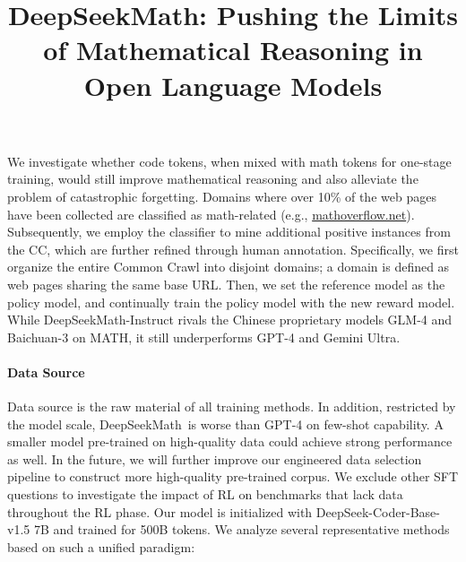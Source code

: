 \title{DeepSeekMath: Pushing the Limits of Mathematical Reasoning in Open Language Models}
We investigate whether code tokens, when mixed with math tokens for one-stage training, would still improve mathematical reasoning and also alleviate the problem of catastrophic forgetting. Domains where over 10\% of the web pages have been collected are classified as math-related (e.g., \url{mathoverflow.net}). Subsequently, we employ the classifier to mine additional positive instances from the CC, which are further refined through human annotation. Specifically, we first organize the entire Common Crawl into disjoint domains; a domain is defined as web pages sharing the same base URL. Then, we set the reference model as the policy model, and continually train the policy model with the new reward model. While DeepSeekMath-Instruct rivals the Chinese proprietary models GLM-4 and Baichuan-3 on MATH, it still underperforms GPT-4 and Gemini Ultra. \paragraph{Data Source} Data source is the raw material of all training methods. In addition, restricted by the model scale, DeepSeekMath~is worse than GPT-4 on few-shot capability. A smaller model pre-trained on high-quality data could achieve strong performance as well. In the future, we will further improve our engineered data selection pipeline to construct more high-quality pre-trained corpus. We exclude other SFT questions to investigate the impact of RL on benchmarks that lack data throughout the RL phase. Our model is initialized with DeepSeek-Coder-Base-v1.5 7B \citep{deepseek-coder} and trained for 500B tokens. We analyze several representative methods based on such a unified paradigm:

